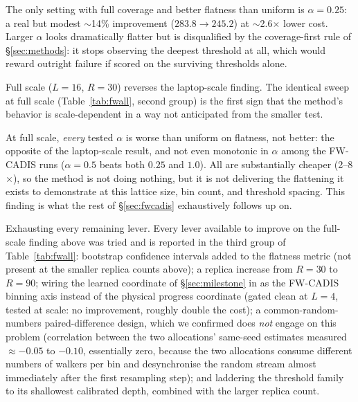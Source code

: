 \documentclass[11pt]{article}
\begin{document}
	The only setting with full coverage and better flatness than uniform is $\alpha=0.25$: a
	real but modest $\sim$14\% improvement ($283.8\to245.2$) at $\sim$2.6$\times$ lower cost.
	Larger $\alpha$ looks dramatically flatter but is disqualified by the coverage-first rule
	of \S\ref{sec:methods}: it stops observing the deepest threshold at all, which would reward
	outright failure if scored on the surviving thresholds alone.

	Full scale ($L=16$, $R=30$) reverses the laptop-scale finding. The identical sweep
	at full scale (Table~\ref{tab:fwall}, second group) is the first sign that the method's
	behavior is scale-dependent in a way not anticipated from the smaller test.

	At full scale, \emph{every} tested $\alpha$ is worse than uniform on flatness, not better:
	the opposite of the laptop-scale result, and not even monotonic in $\alpha$ among the
	FW-CADIS runs ($\alpha=0.5$ beats both $0.25$ and $1.0$). All are substantially cheaper
	(2--8$\times$), so the method is not doing nothing, but it is not delivering the flattening
	it exists to demonstrate at this lattice size, bin count, and threshold spacing. This
	finding is what the rest of \S\ref{sec:fwcadis} exhaustively follows up on.

	Exhausting every remaining lever. Every lever available to improve on the full-scale
	finding above was tried and is reported in the third group of Table~\ref{tab:fwall}:
	bootstrap confidence
	intervals added to the flatness metric (not present at the smaller replica counts above); a
	replica increase from $R=30$ to $R=90$; wiring the learned coordinate of
	\S\ref{sec:milestone} in as the FW-CADIS binning axis instead of the physical progress
	coordinate (gated clean at $L=4$, tested at scale: no improvement, roughly double the
	cost); a common-random-numbers paired-difference design, which we confirmed does
	\emph{not} engage on this problem (correlation between the two allocations'
	same-seed estimates measured $\approx-0.05$ to $-0.10$, essentially zero, because the two
	allocations consume different numbers of walkers per bin and desynchronise the random
	stream almost immediately after the first resampling step); and laddering the threshold
	family to its shallowest calibrated depth, combined with the larger replica count.
\end{document}
